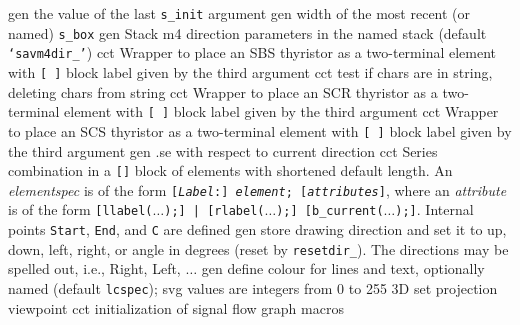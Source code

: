   {gen}
  {the value of the last {\tt s\_init} argument
    }
  {gen}
  {width of the most recent (or named) {\tt s\_box}
    }
  {gen}
  {Stack m4 direction parameters in the named stack
    (default {\tt `savm4dir\_'})}
  {cct}
  {Wrapper to place an SBS thyristor as a two-terminal element with
   {\tt [ ]} block label given by the third argument
    }
  {cct}
  {test if chars are in string, deleting chars from string}
  {cct}
  {Wrapper to place an SCR thyristor as a two-terminal element with
   {\tt [ ]} block label given by the third argument
    }
  {cct}
  {Wrapper to place an SCS thyristor as a two-terminal element with
   {\tt [ ]} block label given by the third argument
    }
  {gen}
  {.se with respect to current direction}
  {cct}
  { Series combination in a {\tt []} block of elements
    with shortened default length.  An {\sl elementspec} is of the form
    {\tt [{\sl Label}:] {\sl element}; [{\sl attributes}]},
    where an {\sl attribute} is of the form
    {\tt [llabel($\ldots$);] | [rlabel($\ldots$);] [b\_current($\ldots$);]}.
    Internal points {\tt Start}, {\tt End}, and {\tt C} are defined
    }
  {gen}
  {store drawing direction and set it to
    up, down, left, right, or angle in degrees (reset by {\tt resetdir\_}).
    The directions may be spelled out, i.e., Right, Left, $\ldots$
   }
  {gen}
  {define colour for lines and text, optionally named (default {\tt lcspec});
   svg values are integers from 0 to 255}
  {3D}
  {set projection viewpoint}
  {cct}
  {initialization of signal flow graph macros}
